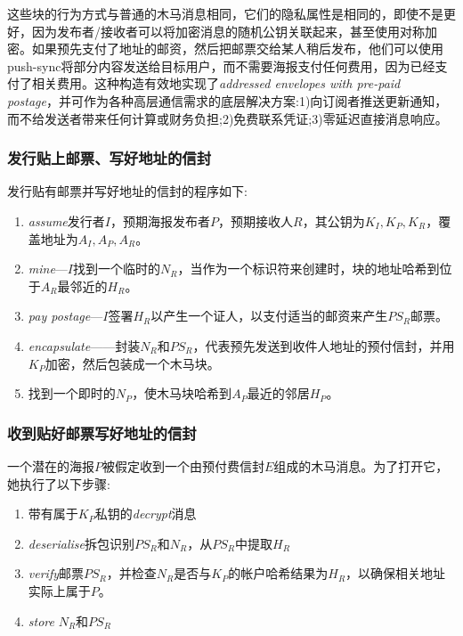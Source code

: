 这些块的行为方式与普通的木马消息相同，它们的隐私属性是相同的，即使不是更好，因为发布者/接收者可以将加密消息的随机公钥关联起来，甚至使用对称加密。如果预先支付了地址的邮资，然后把邮票交给某人稍后发布，他们可以使用push-sync将部分内容发送给目标用户，而不需要海报支付任何费用，因为已经支付了相关费用。这种构造有效地实现了\emph{addressed envelopes with pre-paid postage}，并可作为各种高层通信需求的底层解决方案:1)向订阅者推送更新通知，而不给发送者带来任何计算或财务负担;2)免费联系凭证;3)零延迟直接消息响应。  


\subsubsection{发行贴上邮票、写好地址的信封}

发行贴有邮票并写好地址的信封的程序如下:

\begin{enumerate}
\item \emph{assume}发行者$I$，预期海报发布者$P$，预期接收人$R$，其公钥为$K_I, K_P, K_R$，覆盖地址为$A_I, A_P, A_R$。
\item \emph{mine}—$I$找到一个临时的$N_R$，当作为一个标识符来创建时，块的地址哈希到位于$A_R$最邻近的$H_R$。
\item \emph{pay postage}—$I$签署$H_R$以产生一个证人，以支付适当的邮资来产生$PS_R$邮票。
\item \emph{encapsulate}——封装$N_R$和$PS_R$，代表预先发送到收件人地址的预付信封，并用$K_P$加密，然后包装成一个木马块。
\item 找到一个即时的$N_P$，使木马块哈希到$A_P$最近的邻居$H_P$。 
\end{enumerate}




\subsubsection{收到贴好邮票写好地址的信封}

一个潜在的海报$P$被假定收到一个由预付费信封$E$组成的木马消息。为了打开它，她执行了以下步骤:

\begin{enumerate}
    \item 带有属于$K_P$私钥的\emph{decrypt}消息
    \item \emph{deserialise}拆包识别$PS_R$和$N_R$，从$PS_R$中提取$H_R$
    \item \emph{verify}邮票$PS_R$，并检查$N_R$是否与$K_P$的帐户哈希结果为$H_R$，以确保相关地址实际上属于$P$。
    \item \emph{store} $N_R$和$PS_R$ 
\end{enumerate}

